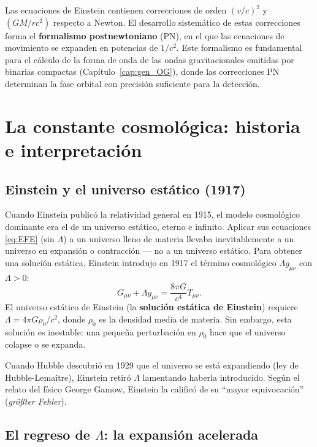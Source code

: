 Las ecuaciones de Einstein contienen correcciones de orden $(v/c)^2$ y $(GM/rc^2)$ respecto a Newton. El desarrollo sistemático de estas correcciones forma el \textbf{formalismo postnewtoniano} (PN), en el que las ecuaciones de movimiento se expanden en potencias de $1/c^2$. Este formalismo es fundamental para el cálculo de la forma de onda de las ondas gravitacionales emitidas por binarias compactas (Capítulo~\ref{cap:gen_OG}), donde las correcciones PN determinan la fase orbital con precisión suficiente para la detección.

\section{La constante cosmológica: historia e interpretación}
\label{sec:constante_cosmologica}

\subsection{Einstein y el universo estático (1917)}

Cuando Einstein publicó la relatividad general en 1915, el modelo cosmológico dominante era el de un universo estático, eterno e infinito. Aplicar sus ecuaciones \eqref{eq:EFE} (sin $\Lambda$) a un universo lleno de materia llevaba inevitablemente a un universo en expansión o contracción — no a un universo estático. Para obtener una solución estática, Einstein introdujo en 1917 el término cosmológico $\Lambda g_{\mu\nu}$ con $\Lambda > 0$:
\begin{equation}
  G_{\mu\nu} + \Lambda g_{\mu\nu} = \frac{8\pi G}{c^4}T_{\mu\nu}.
\end{equation}
El universo estático de Einstein (la \textbf{solución estática de Einstein}) requiere $\Lambda = 4\pi G\rho_0/c^2$, donde $\rho_0$ es la densidad media de materia. Sin embargo, esta solución es inestable: una pequeña perturbación en $\rho_0$ hace que el universo colapse o se expanda.

Cuando Hubble descubrió en 1929 que el universo se está expandiendo (ley de Hubble-Lemaître), Einstein retiró $\Lambda$ lamentando haberla introducido. Según el relato del físico George Gamow, Einstein la calificó de su ``mayor equivocación'' (\textit{größter Fehler}).

\subsection{El regreso de $\Lambda$: la expansión acelerada}

